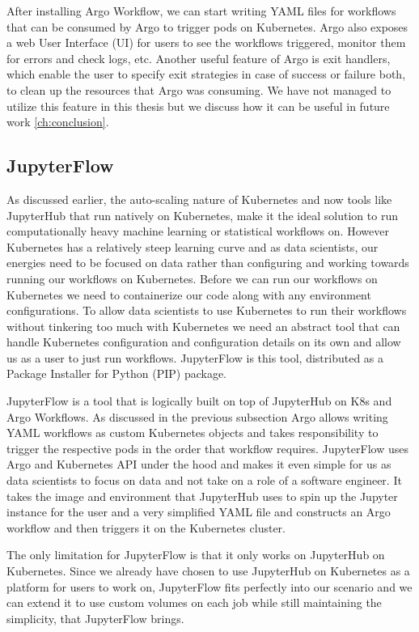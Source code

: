 \bigskip
After installing Argo Workflow, we can start writing YAML files for workflows that can be consumed by Argo to trigger pods on Kubernetes. Argo also exposes a web User Interface (UI) for users to see the workflows triggered, monitor them for errors and check logs, etc. Another useful feature of Argo is exit handlers, which enable the user to specify exit strategies in case of success or failure both, to clean up the resources that Argo was consuming. We have not managed to utilize this feature in this thesis but we discuss how it can be useful in future work \ref{ch:conclusion}.

\subsection{JupyterFlow}
As discussed earlier, the auto-scaling nature of Kubernetes and now tools like JupyterHub that run natively on Kubernetes, make it the ideal solution to run computationally heavy machine learning or statistical workflows on. However Kubernetes has a relatively steep learning curve and as data scientists, our energies need to be focused on data rather than configuring and working towards running our workflows on Kubernetes. Before we can run our workflows on Kubernetes we need to containerize our code along with any environment configurations. To allow data scientists to use Kubernetes to run their workflows without tinkering too much with Kubernetes we need an abstract tool that can handle Kubernetes configuration and configuration details on its own and allow us as a user to just run workflows. JupyterFlow \cite{jupyterflow} is this tool, distributed as a Package Installer for Python (PIP) package.

\bigskip
JupyterFlow is a tool that is logically built on top of JupyterHub on K8s and Argo Workflows. As discussed in the previous subsection Argo allows writing YAML workflows as custom Kubernetes objects and takes responsibility to trigger the respective pods in the order that workflow requires. JupyterFlow uses Argo and Kubernetes API under the hood and makes it even simple for us as data scientists to focus on data and not take on a role of a software engineer. It takes the image and environment that JupyterHub uses to spin up the Jupyter instance for the user and a very simplified YAML file and constructs an Argo workflow and then triggers it on the Kubernetes cluster.

\bigskip
The only limitation for JupyterFlow is that it only works on JupyterHub on Kubernetes. Since we already have chosen to use JupyterHub on Kubernetes as a platform for users to work on, JupyterFlow fits perfectly into our scenario and we can extend it to use custom volumes on each job while still maintaining the simplicity, that JupyterFlow brings.

